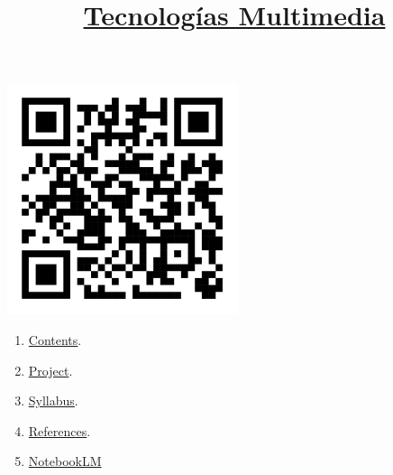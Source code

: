 
%
\title{\href{https://www.ual.es/estudios/grados/presentacion/plandeestudios/asignatura/4015/40154321}{Tecnologías Multimedia}}

\maketitle

\begin{center}
  \includegraphics[width=256px]{TM_codigo_QR.png}
\end{center}

\begin{enumerate}
\item \href{https://tecnologias-multimedia.github.io/contents}{Contents}.
\item \href{https://github.com/Tecnologias-Multimedia/InterCom}{Project}.
\item \href{https://tecnologias-multimedia.github.io/syllabus}{Syllabus}.
\item \href{https://tecnologias-multimedia.github.io/references}{References}.
\item \href{https://notebooklm.google.com/notebook/f9ea7647-def8-4f2c-bdb3-b2e4e41a5ddb?authuser=1}{NotebookLM}
\end{enumerate}
